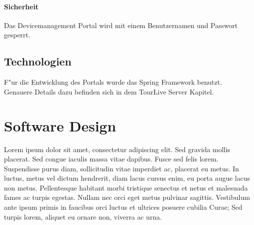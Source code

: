 \paragraph{Sicherheit}
Das Devicemanagement Portal wird mit einem Benutzernamen und Passwort gesperrt. 

\subsection{Technologien}
F"{u}r die Entwicklung des Portals wurde das Spring Framework benutzt. Genauere Details dazu befinden sich in dem TourLive Server Kapitel.



\section{Software Design}

Lorem ipsum dolor sit amet, consectetur adipiscing elit. Sed gravida mollis placerat. Sed congue iaculis massa vitae dapibus. Fusce sed felis lorem. Suspendisse purus diam, sollicitudin vitae imperdiet ac, placerat eu metus. In luctus, metus vel dictum hendrerit, diam lacus cursus enim, eu porta augue lacus non metus. Pellentesque habitant morbi tristique senectus et netus et malesuada fames ac turpis egestas. Nullam nec orci eget metus pulvinar sagittis. Vestibulum ante ipsum primis in faucibus orci luctus et ultrices posuere cubilia Curae; Sed turpis lorem, aliquet eu ornare non, viverra ac urna.